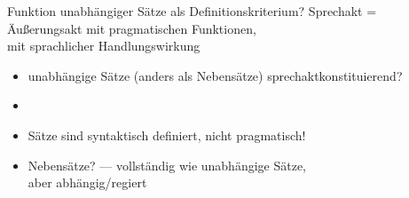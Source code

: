 \begin{frame}
  {Funktion unabhängiger Sätze als Definitionskriterium?}
  \pause
  Sprechakt = Äußerungsakt mit pragmatischen Funktionen,\\
  mit sprachlicher Handlungswirkung
  \Viertelzeile
  \pause
  \begin{itemize}[<+->]
    \item unabhängige Sätze (anders als Nebensätze) \alert{sprechaktkonstituierend}?
  \end{itemize}
  \pause
  \Halbzeile
  \begin{exe}
    \ex\label{ex:hauptsatzundmatrixsatz007}
    \begin{xlist}
      \pause
      \pause
      \pause
    \end{xlist}
  \end{exe}
  \pause
  \Halbzeile
  \begin{itemize}[<+->]
    \item {}
    \item \alert{Sätze sind syntaktisch definiert, nicht pragmatisch!}
    \item \alert{Nebensätze}? --- vollständig wie unabhängige Sätze,\\
      aber \alert{abhängig}\slash \alert{regiert}
  \end{itemize}
\end{frame}


